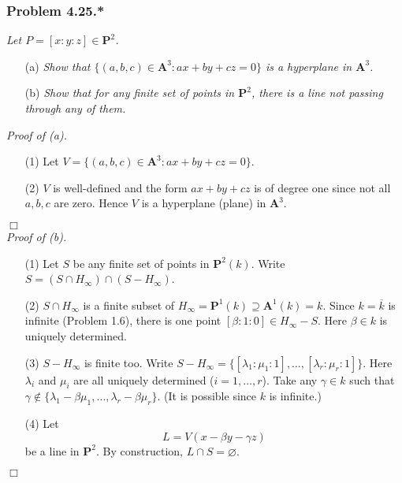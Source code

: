 \documentclass{article}
\begin{document}
\subsubsection*{Problem 4.25.*}
\emph{Let $P = [x : y : z] \in \mathbf{P}^{2}$.}
\begin{enumerate}
\item[(a)]
  \emph{Show that $\{ (a,b,c) \in \mathbf{A}^{3} : ax + by + cz = 0 \}$
  is a hyperplane in $\mathbf{A}^{3}$.}

\item[(b)]
  \emph{Show that for any finite set of points in $\mathbf{P}^{2}$,
  there is a line not passing through any of them.} \\
\end{enumerate}



\emph{Proof of (a).}
\begin{enumerate}
\item[(1)]
  Let $V = \{ (a,b,c) \in \mathbf{A}^{3} : ax + by + cz = 0 \}$.

\item[(2)]
  $V$ is well-defined and the form $ax + by + cz$ is of degree one
  since not all $a, b, c$ are zero.
  Hence $V$ is a hyperplane (plane) in $\mathbf{A}^{3}$.
\end{enumerate}
$\Box$ \\



\emph{Proof of (b).}
\begin{enumerate}
\item[(1)]
  Let $S$ be any finite set of points in $\mathbf{P}^2(k)$.
  Write $S = (S \cap H_{\infty}) \cap (S - H_{\infty})$.

\item[(2)]
  $S \cap H_{\infty}$ is a finite subset of
  $H_{\infty} = \mathbf{P}^{1}(k) \supseteq \mathbf{A}^{1}(k) = k$.
  Since $k = \overline{k}$ is infinite (Problem 1.6),
  there is one point $[\beta:1:0] \in H_{\infty} - S$.
  Here $\beta \in k$ is uniquely determined.

\item[(3)]
  $S - H_{\infty}$ is finite too.
  Write
  $S - H_{\infty} = \{ [ \lambda_1 : \mu_1 : 1 ], \ldots, [ \lambda_r : \mu_r : 1 ] \}$.
  Here $\lambda_i$ and $\mu_i$ are all uniquely determined ($i = 1, \ldots, r$).
  Take any $\gamma \in k$ such that
  $\gamma \not\in\{ \lambda_1 - \beta\mu_1, \ldots,  \lambda_r - \beta\mu_r \}$.
  (It is possible since $k$ is infinite.)

\item[(4)]
  Let
  \[
    L = V(x - \beta y - \gamma z)
  \]
  be a line in $\mathbf{P}^{2}$.
  By construction, $L \cap S = \varnothing$.
\end{enumerate}
$\Box$ \\\\
\end{document}
